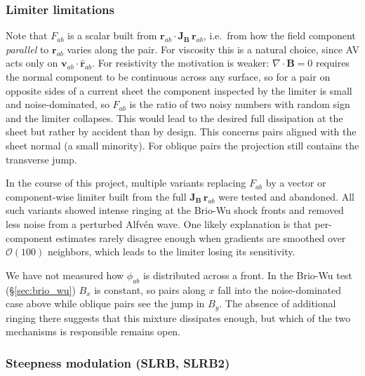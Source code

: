 \subsubsection*{Limiter limitations}
Note that $F_{ab}$ is a scalar built from $\mathbf{r}_{ab}\cdot\mathbf{J}_{\mathbf{B}}\,\mathbf{r}_{ab}$, i.e.\ from how the field component \emph{parallel} to $\mathbf{r}_{ab}$ varies along the pair. For viscosity this is a natural choice, since AV acts only on $\mathbf{v}_{ab}\cdot\hat{\mathbf{r}}_{ab}$. For resistivity the motivation is weaker: $\nabla\cdot\mathbf{B} = 0$ requires the normal component to be continuous across any surface, so for a pair on opposite sides of a current sheet the component inspected by the limiter is small and noise-dominated, so $F_{ab}$ is the ratio of two noisy numbers with random sign and the limiter collapses. This would lead to the desired full dissipation at the sheet but rather by accident than by design. This concerns pairs aligned with the sheet normal (a small minority). For oblique pairs the projection still contains the transverse jump. 

In the course of this project, multiple variants replacing $F_{ab}$ by a vector or component-wise limiter built from the full $\mathbf{J}_{\mathbf{B}}\,\mathbf{r}_{ab}$ were tested and abandoned. All such variants showed intense ringing at the Brio-Wu shock fronts and removed less noise from a perturbed Alfvén wave. One likely explanation is that per-component estimates rarely disagree enough when gradients are smoothed over $\mathcal{O}(100)$ neighbors, which leads to the limiter losing its sensitivity. 

We have not measured how $\phi_{ab}$ is distributed across a front. In the Brio-Wu test (§\ref{sec:brio_wu}) $B_x$ is constant, so pairs along $x$ fall into the noise-dominated case above while oblique pairs see the jump in $B_y$. The absence of additional ringing there suggests that this mixture dissipates enough, but which of the two mechanisms is responsible remains open.

\subsubsection*{Steepness modulation (SLRB, SLRB2)}

